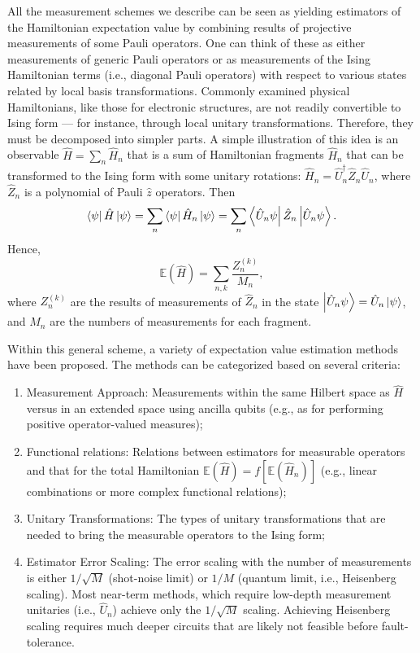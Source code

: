 All the measurement schemes we describe can be seen as yielding estimators of the Hamiltonian expectation value by combining results of projective measurements of some Pauli operators.
One can think of these as either measurements of generic Pauli operators or as measurements of the Ising Hamiltonian terms (i.e., diagonal Pauli operators) with respect to various states related by local basis transformations.
Commonly examined physical Hamiltonians, like those for electronic structures, are not readily convertible to Ising form — for instance, through local unitary transformations. Therefore, they must be decomposed into simpler parts.
A simple illustration of this idea is an observable $\hat H = \sum_n \hat H_n$ that is a sum of Hamiltonian fragments $\hat H_n$ that can be transformed to the Ising form with some unitary rotations: $\hat H_n = \hat U_n^\dagger \hat Z_n \hat U_n$, where $\hat Z_n$ is a polynomial of Pauli $\hat z$ operators. Then
\begin{equation}
    \bra{\psi}\hat H\ket{\psi} = \sum_n\bra{\psi}\hat H_n\ket{\psi} = \sum_n\bra{\hat U_n \psi}\hat Z_n\ket{\hat U_n\psi}.
\end{equation}
Hence,
\begin{equation}
    \mathit{\mathbb{E}}(\hat H) = \sum_{n,k}\frac{Z_n^{(k)}}{M_n},
\end{equation}
where $Z_n^{(k)}$ are the results of measurements of $\hat Z_n$ in the state $\ket{\hat U_n\psi}=\hat U_n\ket{\psi}$, and $M_n$ are the numbers of measurements for each fragment.   

Within this general scheme, a variety of expectation value estimation methods have been proposed.
The methods can be categorized based on several criteria:
\begin{enumerate}
    \item Measurement Approach: Measurements within the same Hilbert space as $\hat H$ versus in an extended space using ancilla qubits (e.g., as for performing positive operator-valued measures);
    \item Functional relations: Relations between estimators for measurable operators and that for the total Hamiltonian $\mathit{\mathbb{E}}(\hat H) = f[\mathit{\mathbb{E}}(\hat H_n)]$ (e.g., linear combinations or more complex functional relations\cite{Zapata:Work}); 
    \item Unitary Transformations: The types of unitary transformations that are needed to bring the measurable operators to the Ising form; 
    \item Estimator Error Scaling: The error scaling with the number of measurements is either $1/\sqrt{M}$ (shot-noise limit) or $1/M$ (quantum limit, i.e., Heisenberg scaling). Most near-term methods, which require low-depth measurement unitaries (i.e., $\hat U_n$) achieve only the $1/\sqrt{M}$ scaling. Achieving Heisenberg scaling requires much deeper circuits that are likely not feasible before fault-tolerance. 
\end{enumerate}


